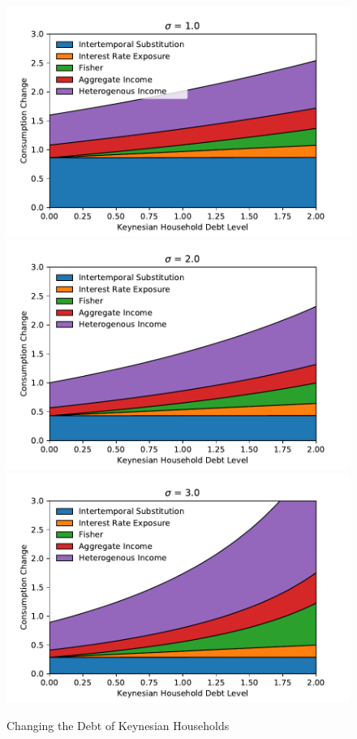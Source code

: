 \documentclass[12pt,a4paper]{article}
\begin{document}
\begin{figure} 
	\begin{centering}
		\includegraphics[scale=0.55]{../Python/DoloCode/Figures/KeynesianDebt_sigma1.pdf}
		\includegraphics[scale=0.55]{../Python/DoloCode/Figures/KeynesianDebt_sigma2.pdf}
		\includegraphics[scale=0.55]{../Python/DoloCode/Figures/KeynesianDebt_sigma3.pdf}
		\caption{Changing the Debt of Keynesian Households}
		\label{fig:KeynesianDebt}
	\end{centering}
\end{figure}
\end{document}

